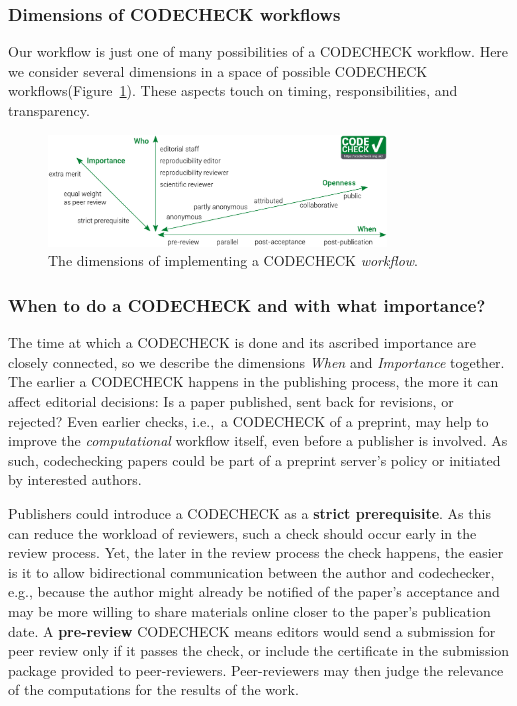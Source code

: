 \documentclass[12pt]{article}
\newcommand{\rev}[1]{\textit{#1}}
\begin{document}
\subsubsection*{Dimensions of CODECHECK workflows}\label{dimensions-of-workflows}

Our workflow is just one of many possibilities of a CODECHECK
workflow.  Here we consider several dimensions in a space of possible
CODECHECK workflows(Figure~\ref{fig:dimensions}).  These aspects touch
on timing, responsibilities, and transparency.

\begin{figure}
  \centering
      \includegraphics[width=0.8\textwidth]{figs/codecheck_dimensions.pdf}
  \caption{The dimensions of implementing a CODECHECK \rev{workflow}.}
  \label{fig:dimensions}
\end{figure}

\subsubsection*{When to do a CODECHECK and with what importance?}
\label{when-to-do-a-codecheck}

The time at which a CODECHECK is done and its ascribed importance are
closely connected, so we describe the dimensions \emph{When} and
\emph{Importance} together.  The earlier a CODECHECK happens in the
publishing process, the more it can affect editorial decisions: Is a
paper published, sent back for revisions, or rejected?  Even earlier
checks, i.e.,~a CODECHECK of a preprint, may help to improve the
\rev{computational} workflow itself, even before a publisher is involved.  As such,
codechecking papers could be part of a preprint server's policy or
initiated by interested authors.

Publishers could introduce a CODECHECK as a \textbf{strict prerequisite}.
As this can reduce the workload of reviewers, such a check should occur early in the review process.
Yet, the later in the review process the check happens, the easier is
it to allow bidirectional communication between the author and
codechecker, e.g., because the author might already be notified of the
paper's acceptance and may be more willing to share materials online closer to the paper's publication date.
A \textbf{pre-review} CODECHECK means editors would send a submission
for peer review only if it passes the check, or include the certificate in the submission package provided to peer-reviewers.
Peer-reviewers may then judge the relevance of the computations for the results of the work.
\end{document}
